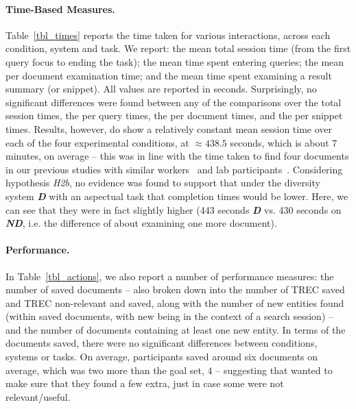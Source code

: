 \paragraph{Time-Based Measures.} Table~\ref{tbl_times} reports the time taken for various interactions, across each condition, system and task. We report: the mean total session time (from the first query focus to ending the task); the mean time spent entering queries; the mean per document examination time; and the mean time spent examining a result summary (or snippet). All values are reported in seconds. Surprisingly, no significant differences were found between any of the comparisons over the total session times, the per query times, the per document times, and the per snippet times. Results, however, do show a relatively constant mean session time over each of the four experimental conditions, at $\approx438.5$ seconds, which is about $7$ minutes, on average -- this was in line with the time taken to find four documents in our previous studies with similar workers~\cite{maxwell2017snippet_length} and lab participants~\cite{maxwell2016agents}.
Considering hypothesis \emph{H2b}, no evidence was found to support that under the diversity system \textbf{\emph{D}} with an aspectual task that completion times would be lower. Here, we can see that they were in fact slightly higher (443 seconds \textbf{\emph{D}} vs. 430 seconds on \textbf{\emph{ND}}, i.e. the difference of about examining one more document). 

\paragraph{Performance.} In Table~\ref{tbl_actions}, we also report a number of performance measures: the number of saved documents -- also broken down into the number of TREC saved and TREC non-relevant and saved, along with the number of new entities found (within saved documents, with new being in the context of a search session) -- and the number of documents containing at least one new entity. In terms of the documents saved, there were no significant differences between conditions, systems or tasks. On average, participants saved around six documents on average, which was two more than the goal set, $4$ -- suggesting that wanted to make sure that they found a few extra, just in case some were not relevant/useful.

